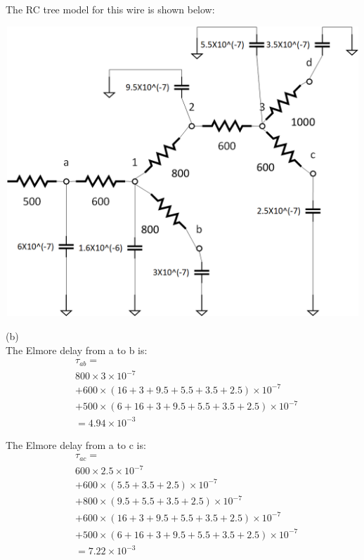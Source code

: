 \documentclass[12pt]{article}
\begin{document}
    The RC tree model for this wire is shown below:

    \begin{center}
        \includegraphics[width = 6.50in, height = 4.30in]{figure4.png}
    \end{center}

    \noindent 
    (b)\\
    The Elmore delay from a to b is:
    \[
        \begin{split}
            & \tau_{ab}= \\
            & 800\times 3\times 10^{-7} \\ 
            & + 600 \times (16+3+9.5+5.5+3.5+2.5)\times 10^{-7} \\
            & + 500 \times (6+16+3+9.5+5.5+3.5+2.5)\times 10^{-7} \\
            & = 4.94 \times 10^{-3}
        \end{split}
    \]

    The Elmore delay from a to c is:
    \[
        \begin{split}
            & \tau_{ac}= \\
            & 600\times 2.5\times 10^{-7} \\ 
            & + 600\times (5.5+3.5+2.5)\times 10^{-7} \\
            & + 800 \times (9.5+5.5+3.5+2.5)\times 10^{-7} \\
            & + 600 \times (16+3+9.5+5.5+3.5+2.5)\times 10^{-7} \\
            & + 500 \times (6+16+3+9.5+5.5+3.5+2.5)\times 10^{-7} \\
            & = 7.22 \times 10^{-3}
        \end{split}
    \]
\end{document}
